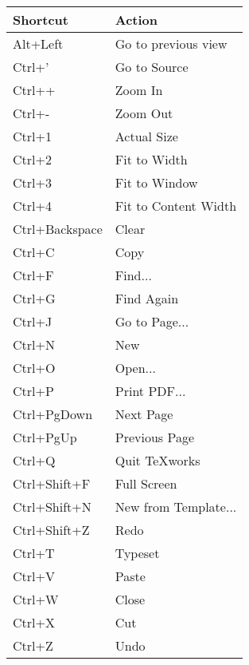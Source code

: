 \begin{longtable}{Pl}
\toprule
Shortcut       & Action \\
\midrule \endhead
Alt+Left       & Go to previous view \\
Ctrl+'         & Go to Source \\
Ctrl++         & Zoom In \\
Ctrl+{-}       & Zoom Out \\
Ctrl+1         & Actual Size \\
Ctrl+2         & Fit to Width \\
Ctrl+3         & Fit to Window \\
Ctrl+4         & Fit to Content Width \\
Ctrl+Backspace & Clear \\
Ctrl+C         & Copy \\
Ctrl+F         & Find... \\
Ctrl+G         & Find Again \\
Ctrl+J         & Go to Page... \\
Ctrl+N         & New \\
Ctrl+O         & Open... \\
Ctrl+P         & Print PDF... \\
Ctrl+PgDown    & Next Page \\
Ctrl+PgUp      & Previous Page \\
Ctrl+Q         & Quit TeXworks \\
Ctrl+Shift+F   & Full Screen \\
Ctrl+Shift+N   & New from Template... \\
Ctrl+Shift+Z   & Redo \\
Ctrl+T         & Typeset \\
Ctrl+V         & Paste \\
Ctrl+W         & Close \\
Ctrl+X         & Cut \\
Ctrl+Z         & Undo \\
\bottomrule
\end{longtable}

